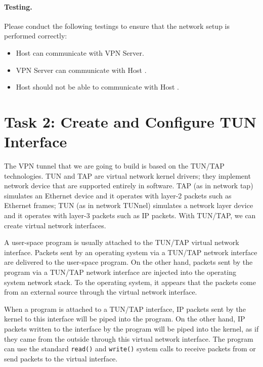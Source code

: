 \paragraph{Testing.} Please conduct the following testings to ensure that the 
network setup is performed correctly:

\begin{itemize}[noitemsep]
\item Host \hostu can communicate with VPN Server.
\item VPN Server can communicate with Host \hostv.
\item Host \hostu should not be able to communicate with Host \hostv. 
\end{itemize}
 



\section{Task 2: Create and Configure TUN Interface}


The VPN tunnel that we are going to build is based on the TUN/TAP 
technologies. 
TUN and TAP are virtual network kernel drivers; they 
implement network device that are supported entirely in software.
TAP (as in network tap) simulates an Ethernet device and it operates with 
layer-2 packets such as Ethernet frames; TUN (as in network TUNnel) simulates a
network layer device and it operates with layer-3 packets such as IP packets.
With TUN/TAP, we can create virtual network interfaces. 


A user-space program is usually attached to the TUN/TAP virtual network interface.
Packets sent by an operating system via a TUN/TAP network interface 
are delivered to the user-space program. On the other hand,
packets sent by the program
via a TUN/TAP network interface are injected into the operating system
network stack. To the operating system,
it appears that the packets come from an external source
through the virtual network interface.


When a program is attached to a TUN/TAP interface, IP packets sent by
the kernel to this interface will be piped into the 
program. On the other hand, IP packets written to the 
interface by the program will be piped into the kernel, as if they came from 
the outside through this virtual network interface. The program can use 
the standard {\tt read()} and {\tt write()} system calls to receive packets 
from or send packets to the virtual interface.


